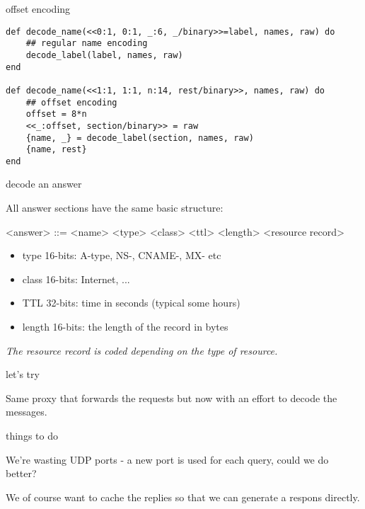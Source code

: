 \begin{frame}[fragile]{offset encoding}

\begin{verbatim}
def decode_name(<<0:1, 0:1, _:6, _/binary>>=label, names, raw) do
    ## regular name encoding
    decode_label(label, names, raw)
end
      
def decode_name(<<1:1, 1:1, n:14, rest/binary>>, names, raw) do
    ## offset encoding
    offset = 8*n
    <<_:offset, section/binary>> = raw
    {name, _} = decode_label(section, names, raw)
    {name, rest}
end
\end{verbatim}

\end{frame}

\begin{frame}[fragile]{decode an answer}

All answer sections have the same basic structure:

\begin{grammar}
<answer> ::= <name> <type> <class> <ttl> <length> <resource record>
\end{grammar}

\begin{itemize}
\item type 16-bits: A-type, NS-, CNAME-, MX- etc
\item class 16-bits: Internet, ...
\item TTL 32-bits: time in seconds (typical some hours)
\item length 16-bits: the length of the record in bytes
\end{itemize}

\vspace{10pt}\pause
{\em The resource record is coded depending on the type of resource.}

\end{frame}


\begin{frame}{let's try}

Same proxy that forwards the requests but now with an effort to decode the messages.

\end{frame}

\begin{frame}{things to do}

We're wasting UDP ports - a new port is used for each query, could we do better?

\vspace{20pt}\pause

We of course want to cache the replies so that we can generate a respons directly.



\end{frame}





